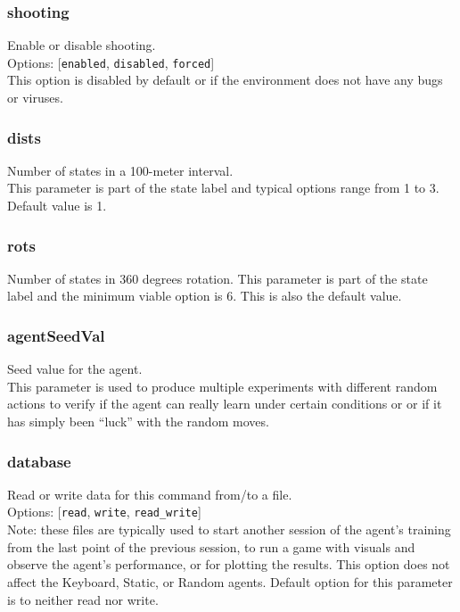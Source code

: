 \subsubsection*{shooting}
\label{opt:shooting}
Enable or disable shooting.\\
Options: [\texttt{enabled}, \texttt{disabled}, \texttt{forced}]\\
This option is disabled by default or if the environment does not have any bugs or viruses.

\subsubsection*{dists}
\label{opt:dists}
Number of states in a 100-meter interval.\\
This parameter is part of the state label and typical options range from 1 to 3. Default value is 1.

\subsubsection*{rots}
\label{opt:rots}
Number of states in 360 degrees rotation.
This parameter is part of the state label and the minimum viable option is 6. This is also the default value.

\subsubsection*{agentSeedVal}
\label{opt:agentSeedVal}
Seed value for the agent.\\
This parameter is used to produce multiple experiments with different random actions to verify if the agent can really learn under certain conditions or or if it has simply been ``luck'' with the random moves.

\subsubsection*{database}
\label{opt:database}
Read or write data for this command from/to a file.\\
Options: [\texttt{read}, \texttt{write}, \texttt{read\_write}]\\
Note: these files are typically used to start another session of the agent's training from the last point of the previous session, to run a game with visuals and observe the agent's performance, or for plotting the results. This option does not affect the Keyboard, Static, or Random agents. Default option for this parameter is to neither read nor write.


